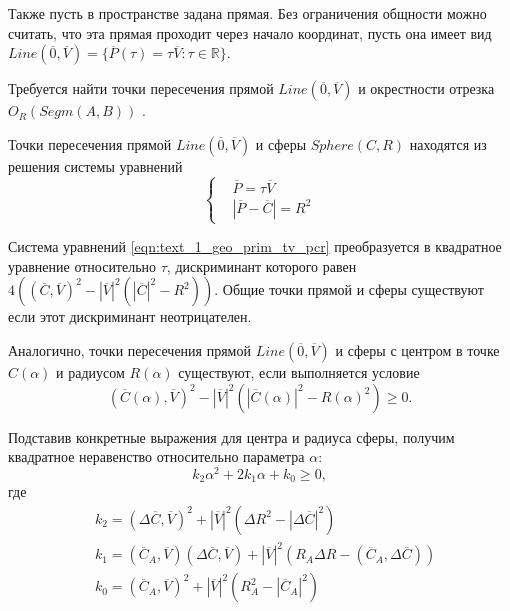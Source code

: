 Также пусть в пространстве задана прямая.
Без ограничения общности можно считать, что эта прямая проходит через начало координат, пусть она имеет вид $Line(\overline{0}, \overline{V}) = \{ \overline{P}(\tau) = \tau \overline{V}: \tau \in \mathbb{R} \}$.

Требуется найти точки пересечения прямой $Line(\overline{0}, \overline{V})$ и окрестности отрезка $O_R(Segm(A, B))$ \cite{Rybakov2017Flight}.

Точки пересечения прямой $Line(\overline{0}, \overline{V})$ и сферы $Sphere(C, R)$ находятся из решения системы уравнений
\begin{equation}\label{eqn:text_1_geo_prim_tv_pcr}
	\left\{
		\begin{aligned}
			& \overline{P} = \tau \overline{V} \\
			& |\overline{P} - \overline{C}| = R^2
		\end{aligned}
	\right.
\end{equation}

Система уравнений \eqref{eqn:text_1_geo_prim_tv_pcr} преобразуется в квадратное уравнение относительно $\tau$, дискриминант которого равен $4\left((\overline{C}, \overline{V})^2 - |\overline{V}|^2 \left(|\overline{C}|^2 - R^2\right)\right)$.
Общие точки прямой и сферы существуют если этот дискриминант неотрицателен.

Аналогично, точки пересечения прямой $Line(\overline{0}, \overline{V})$ и сферы с центром в точке $C(\alpha)$ и радиусом $R(\alpha)$ существуют, если выполняется условие
\begin{equation}
	(\overline{C}(\alpha), \overline{V})^2 - |\overline{V}|^2 \left(|\overline{C}(\alpha)|^2 - R(\alpha)^2\right) \ge 0.
\end{equation}

Подставив конкретные выражения для центра и радиуса сферы, получим квадратное неравенство относительно параметра $\alpha$:
\begin{equation}\label{eqn:text_1_geo_prim_ineq_k2k1k0}
	k_2 \alpha^2 + 2 k_1 \alpha + k_0 \ge 0,
\end{equation}
где
\begin{equation}\label{eqn:text_1_geo_prim_k2k1k0}
	\begin{aligned}
		& k_2 = (\Delta \overline{C}, \overline{V})^2 + |\overline{V}|^2 \left( \Delta R^2 - |\Delta \overline{C}|^2 \right) \\
		& k_1 = (\overline{C}_A, \overline{V})(\Delta \overline{C}, \overline{V}) + |\overline{V}|^2 \left(R_A \Delta R - (\overline{C}_A, \Delta \overline{C}) \right) \\
		& k_0 = (\overline{C}_A, \overline{V})^2 + |\overline{V}|^2 \left( R_A^2 - |\overline{C}_A|^2 \right)
	\end{aligned}
\end{equation}

